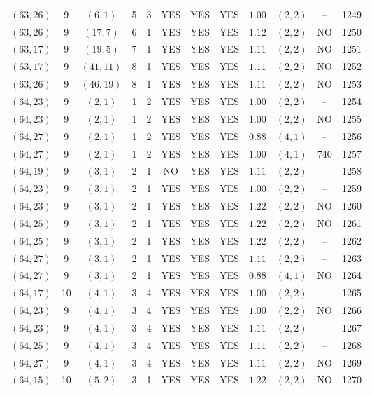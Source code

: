 \begin{longtable}{|c|c|c|c|c|c|c|c|c|c|c|c|}
$(63,26)$ & 9 & $(6,1)$ & 5 & 3 & YES & YES & YES & $1.00$ & $(2,2)$ & -- & 1249\\
$(63,26)$ & 9 & $(17,7)$ & 6 & 1 & YES & YES & YES & $1.12$ & $(2,2)$ & NO & 1250\\
$(63,17)$ & 9 & $(19,5)$ & 7 & 1 & YES & YES & YES & $1.11$ & $(2,2)$ & NO & 1251\\
$(63,17)$ & 9 & $(41,11)$ & 8 & 1 & YES & YES & YES & $1.11$ & $(2,2)$ & NO & 1252\\
$(63,26)$ & 9 & $(46,19)$ & 8 & 1 & YES & YES & YES & $1.11$ & $(2,2)$ & NO & 1253\\
$(64,23)$ & 9 & $(2,1)$ & 1 & 2 & YES & YES & YES & $1.00$ & $(2,2)$ & -- & 1254\\
$(64,23)$ & 9 & $(2,1)$ & 1 & 2 & YES & YES & YES & $1.00$ & $(2,2)$ & NO & 1255\\
$(64,27)$ & 9 & $(2,1)$ & 1 & 2 & YES & YES & YES & $0.88$ & $(4,1)$ & -- & 1256\\
$(64,27)$ & 9 & $(2,1)$ & 1 & 2 & YES & YES & YES & $1.00$ & $(4,1)$ & 740 & 1257\\
$(64,19)$ & 9 & $(3,1)$ & 2 & 1 & NO & YES & YES & $1.11$ & $(2,2)$ & -- & 1258\\
$(64,23)$ & 9 & $(3,1)$ & 2 & 1 & YES & YES & YES & $1.00$ & $(2,2)$ & -- & 1259\\
$(64,23)$ & 9 & $(3,1)$ & 2 & 1 & YES & YES & YES & $1.22$ & $(2,2)$ & NO & 1260\\
$(64,25)$ & 9 & $(3,1)$ & 2 & 1 & YES & YES & YES & $1.22$ & $(2,2)$ & NO & 1261\\
$(64,25)$ & 9 & $(3,1)$ & 2 & 1 & YES & YES & YES & $1.22$ & $(2,2)$ & -- & 1262\\
$(64,27)$ & 9 & $(3,1)$ & 2 & 1 & YES & YES & YES & $1.11$ & $(2,2)$ & -- & 1263\\
$(64,27)$ & 9 & $(3,1)$ & 2 & 1 & YES & YES & YES & $0.88$ & $(4,1)$ & NO & 1264\\
$(64,17)$ & 10 & $(4,1)$ & 3 & 4 & YES & YES & YES & $1.00$ & $(2,2)$ & -- & 1265\\
$(64,23)$ & 9 & $(4,1)$ & 3 & 4 & YES & YES & YES & $1.00$ & $(2,2)$ & NO & 1266\\
$(64,23)$ & 9 & $(4,1)$ & 3 & 4 & YES & YES & YES & $1.11$ & $(2,2)$ & -- & 1267\\
$(64,25)$ & 9 & $(4,1)$ & 3 & 4 & YES & YES & YES & $1.11$ & $(2,2)$ & -- & 1268\\
$(64,27)$ & 9 & $(4,1)$ & 3 & 4 & YES & YES & YES & $1.11$ & $(2,2)$ & NO & 1269\\
$(64,15)$ & 10 & $(5,2)$ & 3 & 1 & YES & YES & YES & $1.22$ & $(2,2)$ & NO & 1270\\

\end{longtable}
